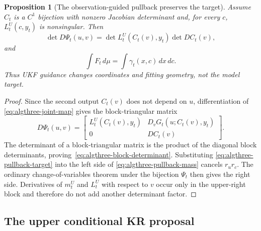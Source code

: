 \documentclass[11pt]{article}
\newtheorem{proposition}{Proposition}
\begin{document}
\begin{proposition}[The observation-guided pullback preserves the target]
\label{prop:algthree-pullback}
Assume $C_t$ is a $C^1$ bijection with nonzero Jacobian determinant and, for
every $c$, $L_t^U(c,y_t)$ is nonsingular.  Then
\begin{equation}
 \det D\Psi_t(u,v)
 =\det L_t^U(C_t(v),y_t)\det DC_t(v),
 \label{eq:algthree-block-determinant}
\end{equation}
and
\begin{equation}
 \int F_t\,d\mu=\int\gamma_t(x,c)\,dx\,dc.
 \label{eq:algthree-pullback-mass}
\end{equation}
Thus UKF guidance changes coordinates and fitting geometry, not the model
target.
\end{proposition}

\begin{proof}
Since the second output $C_t(v)$ does not depend on $u$, differentiation of
\eqref{eq:algthree-joint-map} gives the block-triangular matrix
\[
 D\Psi_t(u,v)=
 \begin{bmatrix}
   L_t^U(C_t(v),y_t) & D_vG_t(u;C_t(v),y_t)\\
   0                  & DC_t(v)
 \end{bmatrix}.
\]
The determinant of a block-triangular matrix is the product of the diagonal
block determinants, proving~\eqref{eq:algthree-block-determinant}.  Substituting
\eqref{eq:algthree-pullback-target} into the left side of
\eqref{eq:algthree-pullback-mass} cancels $r_u r_c$.  The ordinary
change-of-variables theorem under the bijection $\Psi_t$ then gives the right
side.  Derivatives of $m_t^U$ and $L_t^U$ with respect to $v$ occur only in the
upper-right block and therefore do not add another determinant factor.
\end{proof}

\subsection{The upper conditional KR proposal}
\end{document}

